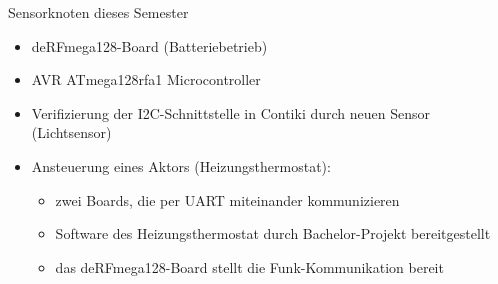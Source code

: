 \begin{frame}{Sensorknoten dieses Semester}
	\begin{itemize}
	\item 	deRFmega128-Board (Batteriebetrieb)
	\item 	AVR ATmega128rfa1 Microcontroller
	\item 	Verifizierung der I2C-Schnittstelle in Contiki durch neuen Sensor (Lichtsensor)
	\item 	Ansteuerung eines Aktors (Heizungsthermostat):
			\begin{itemize}
			\item 	zwei Boards, die per UART miteinander kommunizieren
			\item 	Software des Heizungsthermostat
					durch Bachelor-Projekt
					bereitgestellt
			\item 	das deRFmega128-Board stellt die Funk-Kommunikation bereit
			\end{itemize}
	\end{itemize}
\end{frame}

